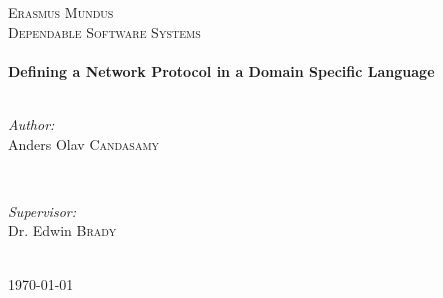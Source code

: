 \begin{titlepage}
\textsc{\Large Erasmus Mundus}\\[0.5cm] %
\textsc{\large Dependable Software Systems}\\[0.5cm] %


\HRule \\[0.4cm]
{ \huge \bfseries Defining a Network Protocol in a Domain Specific Language}\\[0.4cm] %
\HRule \\[1.5cm]
 

\begin{minipage}{0.4\textwidth}
\begin{flushleft} \large
\emph{Author:}\\
Anders Olav \textsc{Candasamy} %
\end{flushleft}
\end{minipage}
~
\begin{minipage}{0.4\textwidth}
\begin{flushright} \large
\emph{Supervisor:} \\
Dr. Edwin \textsc{Brady} %

\end{flushright}
\end{minipage}\\[4cm]



{\large \today}\\[3cm] %


 

\vfill %
\end{titlepage}
\clearpage

